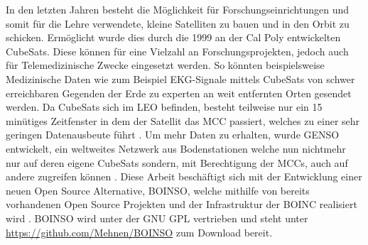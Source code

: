 In den letzten Jahren besteht die Möglichkeit für Forschungseinrichtungen und somit für die Lehre verwendete, kleine Satelliten zu bauen und in den Orbit zu schicken. Ermöglicht wurde dies durch die 1999 an der \acf{Cal Poly} entwickelten 	CubeSats.
\newline
Diese können für eine Vielzahl an Forschungsprojekten, jedoch auch für Telemedizinische Zwecke eingesetzt werden. 
So könnten beispielsweise Medizinische Daten wie zum Beispiel EKG-Signale mittels CubeSats von schwer erreichbaren Gegenden der Erde zu experten an weit entfernten Orten gesendet werden.
\newline
Da CubeSats sich im \ac{LEO} befinden, besteht teilweise nur ein 15 minütiges Zeitfenster in dem der Satellit das \ac{MCC} passiert, welches zu einer sehr geringen Datenausbeute führt \cite{preindl_optimization_2010}. Um mehr Daten zu erhalten, wurde \ac{GENSO} entwickelt, ein weltweites Netzwerk aus Bodenstationen welche nun nichtmehr nur auf deren eigene CubeSats sondern, mit Berechtigung der \acp{MCC}, auch auf andere zugreifen können \cite{leveque_global_2007}.
\newline
Diese Arbeit beschäftigt sich mit der Entwicklung einer neuen Open Source Alternative, \ac{BOINSO}, welche mithilfe von bereits vorhandenen Open Source Projekten und der Infrastruktur der \ac{BOINC} realisiert wird \cite{ries_boinc_2012}.
\newline
\ac{BOINSO} wird unter der \ac{GNU GPL} vertrieben und steht unter \url{https://github.com/Mehnen/BOINSO} zum Download bereit.